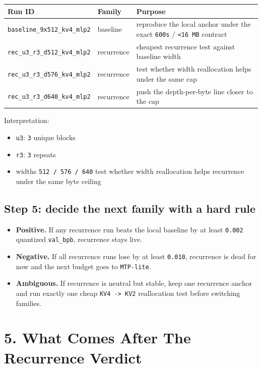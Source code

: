 \documentclass[11pt]{article}
\begin{document}
\begin{center}
\begin{tabularx}{\linewidth}{@{}l l Y@{}}
\toprule
\textbf{Run ID} & \textbf{Family} & \textbf{Purpose} \\
\midrule
\texttt{baseline\_9x512\_kv4\_mlp2} & baseline & reproduce the local anchor under the exact \texttt{600s} / \texttt{<16 MB} contract \\
\texttt{rec\_u3\_r3\_d512\_kv4\_mlp2} & recurrence & cheapest recurrence test against baseline width \\
\texttt{rec\_u3\_r3\_d576\_kv4\_mlp2} & recurrence & test whether width reallocation helps under the same cap \\
\texttt{rec\_u3\_r3\_d640\_kv4\_mlp2} & recurrence & push the depth-per-byte line closer to the cap \\
\bottomrule
\end{tabularx}
\end{center}

Interpretation:

\begin{itemize}
    \item \texttt{u3}: \texttt{3} unique blocks
    \item \texttt{r3}: \texttt{3} repeats
    \item widths \texttt{512 / 576 / 640} test whether width reallocation helps recurrence under the same byte ceiling
\end{itemize}

\subsection*{Step 5: decide the next family with a hard rule}

\begin{itemize}
    \item \textbf{Positive.} If any recurrence run beats the local baseline by at least \texttt{0.002} quantized \texttt{val\_bpb}, recurrence stays live.
    \item \textbf{Negative.} If all recurrence runs lose by at least \texttt{0.010}, recurrence is dead for now and the next budget goes to \texttt{MTP-lite}.
    \item \textbf{Ambiguous.} If recurrence is neutral but stable, keep one recurrence anchor and run exactly one cheap \texttt{KV4 -> KV2} reallocation test before switching families.
\end{itemize}

\section*{5. What Comes After The Recurrence Verdict}
\end{document}

